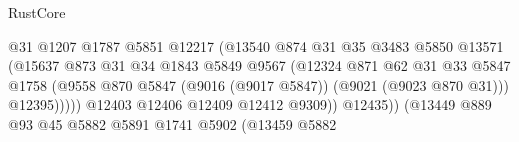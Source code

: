 \begin{lexlean}{RustCore}
\begin{coremodule}
                                                @31
                                                @1207
                                                @1787
                                                @5851
                                                @12217
                                                (@13540
                                                  @874
                                                  @31
                                                  @35
                                                  @3483
                                                  @5850
                                                  @13571
                                                  (@15637
                                                    @873
                                                    @31
                                                    @34
                                                    @1843
                                                    @5849
                                                    @9567
                                                    (@12324
                                                      @871
                                                      @62
                                                      @31
                                                      @33
                                                      @5847
                                                      @1758
                                                      (@9558
                                                        @870
                                                        @5847
                                                        (@9016 (@9017 @5847))
                                                        (@9021 (@9023 @870 @31)))
                                                      @12395)))))
                                            @12403
                                            @12406
                                            @12409
                                            @12412
                                            @9309))
                                        @12435))
                                    (@13449
                                      @889
                                      @93
                                      @45
                                      @5882
                                      @5891
                                      @1741
                                      @5902
                                      (@13459
                                        @5882

\end{coremodule}
\end{lexlean}
